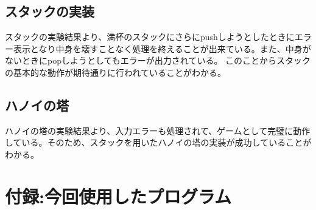 \documentclass[dvipdfmx]{jsarticle}
\begin{document}
\subsection{スタックの実装}
スタックの実験結果より、満杯のスタックにさらにpushしようとしたときにエラー表示となり中身を壊すことなく処理を終えることが出来ている。また、中身がないときにpopしようとしてもエラーが出力されている。
このことからスタックの基本的な動作が期待通りに行われていることがわかる。
\subsection{ハノイの塔}
ハノイの塔の実験結果より、入力エラーも処理されて、ゲームとして完璧に動作している。そのため、スタックを用いたハノイの塔の実装が成功していることがわかる。

\section{付録:今回使用したプログラム}
% 
% 
\end{document}
